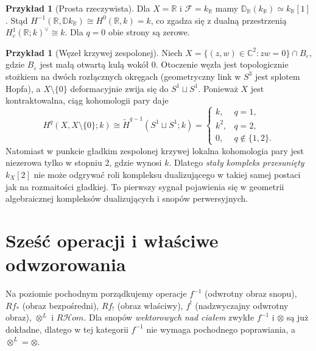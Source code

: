 \documentclass[11pt,a4paper,oneside]{report}
\newcommand{\R}{\mathbb{R}}
\newcommand{\C}{\mathbb{C}}
\theoremstyle{plain}
\theoremstyle{definition}
\newtheorem{przyklad}[twierdzenie]{Przykład}
\theoremstyle{remark}
\begin{document}
\begin{przyklad}[Prosta rzeczywista]
Dla $X=\R$ i $\mathcal F=k_\R$ mamy
$\mathbb D_\R(k_\R)\simeq k_\R[1]$.
Stąd $H^{-1}(\R,\mathbb D k_\R)\cong H^0(\R,k)=k$,
co zgadza się z dualną przestrzenią
$H_c^1(\R;k)^\vee\cong k$.
Dla $q=0$ obie strony są zerowe.
\end{przyklad}

\begin{przyklad}[Węzeł krzywej zespolonej]
\label{ex:node-duality-v12}
Niech $X=\{(z,w)\in\C^2:zw=0\}\cap B_\varepsilon$,
gdzie $B_\varepsilon$ jest małą otwartą kulą wokół $0$.
Otoczenie węzła jest topologicznie stożkiem na
dwóch rozłącznych okręgach (geometryczny link w $S^3$
jest splotem Hopfa), a $X\setminus\{0\}$ deformacyjnie zwija się
do $S^1\sqcup S^1$. Ponieważ $X$ jest kontraktowalna,
ciąg kohomologii pary daje
\[
H^q(X,X\setminus\{0\};k)\cong
\widetilde H^{q-1}(S^1\sqcup S^1;k)
=\begin{cases}
k,&q=1,\\k^2,&q=2,\\0,&q\notin\{1,2\}.
\end{cases}
\]
Natomiast w punkcie gładkim zespolonej krzywej
lokalna kohomologia pary jest niezerowa tylko w stopniu $2$,
gdzie wynosi $k$. Dlatego \emph{stały kompleks przesunięty}
$k_X[2]$ nie może odgrywać roli kompleksu dualizującego
w takiej samej postaci jak na rozmaitości gładkiej.
To pierwszy sygnał pojawienia się w geometrii
algebraicznej kompleksów dualizujących i snopów perwersyjnych.
\end{przyklad}

\section{Sześć operacji i właściwe odwzorowania}
Na poziomie pochodnym porządkujemy operacje
$f^{-1}$ (odwrotny obraz snopu), $Rf_*$ (obraz bezpośredni),
$Rf_!$ (obraz właściwy), $f^!$ (nadzwyczajny odwrotny obraz),
$\otimes^L$ i $R\mathcal Hom$.
Dla snopów \emph{wektorowych nad ciałem} zwykłe $f^{-1}$
i $\otimes$ są już dokładne, dlatego w tej kategorii $f^{-1}$ nie wymaga
pochodnego poprawiania, a $\otimes^L=\otimes$.
\end{document}
